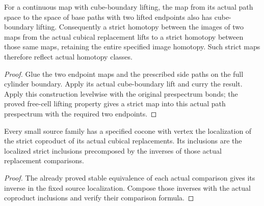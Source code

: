 \begin{proposition}
  \label{prop:actual-endpoint-preserving-homotopy-lifting}
  \leanok
  For a continuous map with cube-boundary lifting, the map from its actual path space to the space of base paths with two lifted endpoints also has cube-boundary lifting. Consequently a strict homotopy between the images of two maps from the actual cubical replacement lifts to a strict homotopy between those same maps, retaining the entire specified image homotopy. Such strict maps therefore reflect actual homotopy classes.
\end{proposition}
\begin{proof}
  Glue the two endpoint maps and the prescribed side paths on the full cylinder boundary. Apply its actual cube-boundary lift and curry the result. Apply this construction levelwise with the original prespectrum bonds; the proved free-cell lifting property gives a strict map into this actual path prespectrum with the required two endpoints.
  \leanok
\end{proof}

\begin{proposition}
  \label{prop:actual-source-derived-coproduct-cocone}
  \leanok
  Every small source family has a specified cocone with vertex the localization of the strict coproduct of its actual cubical replacements. Its inclusions are the localized strict inclusions precomposed by the inverses of those actual replacement comparisons.
\end{proposition}
\begin{proof}
  The already proved stable equivalence of each actual comparison gives its inverse in the fixed source localization. Compose those inverses with the actual coproduct inclusions and verify their comparison formula.
  \leanok
\end{proof}

